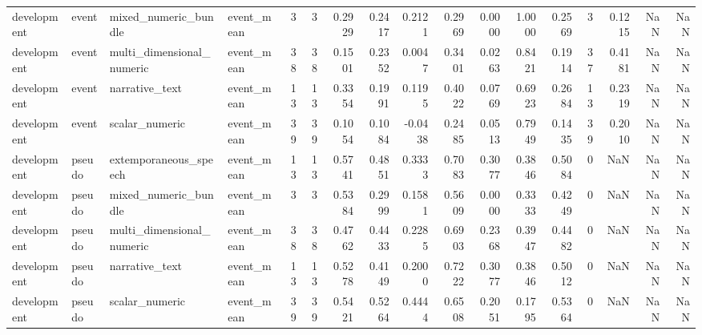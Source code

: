 \begin{tabular}{llllrrrrrrrrrrrrr}
development & event & mixed_numeric_bundle & event_mean & 3 & 3 & 0.2929 & 0.2417 & 0.2121 & 0.2969 & 0.0000 & 1.0000 & 0.2569 & 3 & 0.1215 & NaN & NaN \\
development & event & multi_dimensional_numeric & event_mean & 38 & 38 & 0.1501 & 0.2352 & 0.0047 & 0.3401 & 0.0263 & 0.8421 & 0.1914 & 37 & 0.4181 & NaN & NaN \\
development & event & narrative_text & event_mean & 13 & 13 & 0.3354 & 0.1991 & 0.1195 & 0.4022 & 0.0769 & 0.6923 & 0.2684 & 13 & 0.2319 & NaN & NaN \\
development & event & scalar_numeric & event_mean & 39 & 39 & 0.1054 & 0.1084 & -0.0438 & 0.2485 & 0.0513 & 0.7949 & 0.1435 & 39 & 0.2010 & NaN & NaN \\
development & pseudo & extemporaneous_speech & event_mean & 13 & 13 & 0.5741 & 0.4851 & 0.3333 & 0.7083 & 0.3077 & 0.3846 & 0.5084 & 0 & NaN & NaN & NaN \\
development & pseudo & mixed_numeric_bundle & event_mean & 3 & 3 & 0.5384 & 0.2999 & 0.1581 & 0.5609 & 0.0000 & 0.3333 & 0.4249 & 0 & NaN & NaN & NaN \\
development & pseudo & multi_dimensional_numeric & event_mean & 38 & 38 & 0.4762 & 0.4433 & 0.2285 & 0.6903 & 0.2368 & 0.3947 & 0.4482 & 0 & NaN & NaN & NaN \\
development & pseudo & narrative_text & event_mean & 13 & 13 & 0.5278 & 0.4149 & 0.2000 & 0.7222 & 0.3077 & 0.3846 & 0.5012 & 0 & NaN & NaN & NaN \\
development & pseudo & scalar_numeric & event_mean & 39 & 39 & 0.5421 & 0.5264 & 0.4444 & 0.6508 & 0.2051 & 0.1795 & 0.5364 & 0 & NaN & NaN & NaN \\
\bottomrule
\end{tabular}
